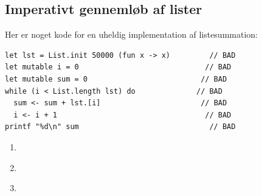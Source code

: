 \documentclass[rgb]{beamer}
\begin{document}
\subsection{Imperativt gennemløb af lister}

\begin{frame}[fragile]
\begin{footnotesize}

  \vspace{1ex}

  Her er noget kode for en uheldig implementation af listesummation:
  \vspace{1ex}

\begin{lstlisting}[numbers=none,frame=none]
let lst = List.init 50000 (fun x -> x)         // BAD
let mutable i = 0                             // BAD
let mutable sum = 0                          // BAD
while (i < List.length lst) do              // BAD
  sum <- sum + lst.[i]                       // BAD
  i <- i + 1                                  // BAD
printf "%d\n" sum                              // BAD
\end{lstlisting}

\vspace{1ex}
\vspace{1ex}

  \begin{enumerate}
  \item \underline{\hspace{10cm}}  %
  \item \underline{\hspace{10cm}}  %
  \item \underline{\hspace{10cm}}  %
\end{enumerate}
\end{footnotesize}

\end{frame}
\end{document}
